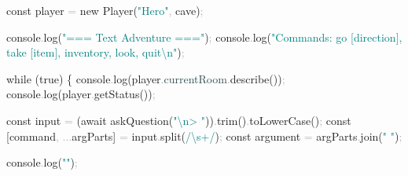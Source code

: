 \documentclass[
  justified,
  openright,
]{tufte-book}
\newcommand{\AttributeTok}[1]{\textcolor{DarkSlateGray}{#1}}
\newcommand{\BuiltInTok}[1]{#1}
\newcommand{\ControlFlowTok}[1]{\textcolor{BrandBlue}{#1}}
\newcommand{\FunctionTok}[1]{\textcolor{BrandBlue}{#1}}
\newcommand{\KeywordTok}[1]{\textcolor{BrandBlue}{#1}}
\newcommand{\NormalTok}[1]{#1}
\newcommand{\OperatorTok}[1]{\textcolor{DarkGray}{#1}}
\newcommand{\SpecialCharTok}[1]{\textcolor{Teal}{#1}}
\newcommand{\SpecialStringTok}[1]{\textcolor{Teal}{#1}}
\newcommand{\StringTok}[1]{\textcolor{Teal}{#1}}
\newenvironment{Shaded}{%
  \begin{snugshade}
}{%
  \end{snugshade}
}
\begin{document}
\begin{Shaded}
\begin{Highlighting}[]
  \KeywordTok{const}\NormalTok{ player }\OperatorTok{=} \KeywordTok{new} \FunctionTok{Player}\NormalTok{(}\StringTok{"Hero"}\OperatorTok{,}\NormalTok{ cave)}\OperatorTok{;}

  \BuiltInTok{console}\OperatorTok{.}\FunctionTok{log}\NormalTok{(}\StringTok{"=== Text Adventure ==="}\NormalTok{)}\OperatorTok{;}
  \BuiltInTok{console}\OperatorTok{.}\FunctionTok{log}\NormalTok{(}\StringTok{"Commands: go [direction], take [item], inventory, look, quit}\SpecialCharTok{\textbackslash{}n}\StringTok{"}\NormalTok{)}\OperatorTok{;}

  \ControlFlowTok{while}\NormalTok{ (}\KeywordTok{true}\NormalTok{) \{}
    \BuiltInTok{console}\OperatorTok{.}\FunctionTok{log}\NormalTok{(player}\OperatorTok{.}\AttributeTok{currentRoom}\OperatorTok{.}\FunctionTok{describe}\NormalTok{())}\OperatorTok{;}
    \BuiltInTok{console}\OperatorTok{.}\FunctionTok{log}\NormalTok{(player}\OperatorTok{.}\FunctionTok{getStatus}\NormalTok{())}\OperatorTok{;}

    \KeywordTok{const}\NormalTok{ input }\OperatorTok{=}\NormalTok{ (}\ControlFlowTok{await} \FunctionTok{askQuestion}\NormalTok{(}\StringTok{"}\SpecialCharTok{\textbackslash{}n}\StringTok{\textgreater{} "}\NormalTok{))}\OperatorTok{.}\FunctionTok{trim}\NormalTok{()}\OperatorTok{.}\FunctionTok{toLowerCase}\NormalTok{()}\OperatorTok{;}
    \KeywordTok{const}\NormalTok{ [command}\OperatorTok{,} \OperatorTok{...}\NormalTok{argParts] }\OperatorTok{=}\NormalTok{ input}\OperatorTok{.}\FunctionTok{split}\NormalTok{(}\SpecialStringTok{/}\SpecialCharTok{\textbackslash{}s+}\SpecialStringTok{/}\NormalTok{)}\OperatorTok{;}
    \KeywordTok{const}\NormalTok{ argument }\OperatorTok{=}\NormalTok{ argParts}\OperatorTok{.}\FunctionTok{join}\NormalTok{(}\StringTok{" "}\NormalTok{)}\OperatorTok{;}

    \BuiltInTok{console}\OperatorTok{.}\FunctionTok{log}\NormalTok{(}\StringTok{""}\NormalTok{)}\OperatorTok{;}


\end{Highlighting}
\end{Shaded}
\end{document}
